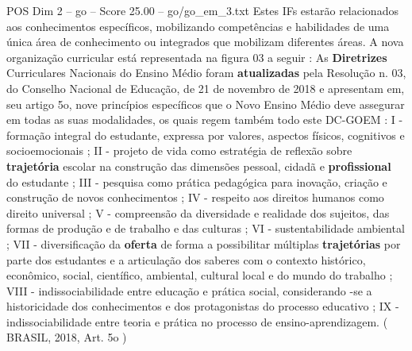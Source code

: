 \begin{textsample}{POS Dim 2 – go – Score 25.00 – go/go\_em\_3.txt}
Estes IFs estarão relacionados aos conhecimentos específicos, mobilizando competências e habilidades de uma única área de conhecimento ou integrados que mobilizam diferentes áreas.
A nova organização curricular está representada na figura 03 a seguir : As \textbf{Diretrizes} Curriculares Nacionais do Ensino Médio foram \textbf{atualizadas} pela Resolução n. 03, do Conselho Nacional de Educação, de 21 de novembro de 2018 e apresentam em, seu artigo 5o, nove princípios específicos que o Novo Ensino Médio deve assegurar em todas as suas modalidades, os quais regem também todo este DC-GOEM : I - formação integral do estudante, expressa por valores, aspectos físicos, cognitivos e socioemocionais ; II - projeto de vida como estratégia de reflexão sobre \textbf{trajetória} escolar na construção das dimensões pessoal, cidadã e \textbf{profissional} do estudante ; III - pesquisa como prática pedagógica para inovação, criação e construção de novos conhecimentos ; IV - respeito aos direitos humanos como direito universal ; V - compreensão da diversidade e realidade dos sujeitos, das formas de produção e de trabalho e das culturas ; VI - sustentabilidade ambiental ; VII - diversificação da \textbf{oferta} de forma a possibilitar múltiplas \textbf{trajetórias} por parte dos estudantes e a articulação dos saberes com o contexto histórico, econômico, social, científico, ambiental, cultural local e do mundo do trabalho ; VIII - indissociabilidade entre educação e prática social, considerando -se a historicidade dos conhecimentos e dos protagonistas do processo educativo ; IX - indissociabilidade entre teoria e prática no processo de ensino-aprendizagem. ( BRASIL, 2018, Art. 5o )

\end{textsample}
